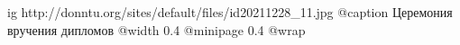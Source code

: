  
 
 
 
 

\ifcmt
  ig http://donntu.org/sites/default/files/id20211228_11.jpg
	@caption Церемония вручения дипломов
  @width 0.4
  @minipage 0.4
  @wrap \parpic[r]
\fi
